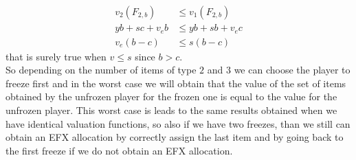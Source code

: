\documentclass{article}
\begin{document}
\begin{align*}
    v_2(F_{2,b}) &\le v_1(F_{2,b})\\
    yb + sc + v_e b &\le yb + sb + v_e c\\
    v_e(b-c) &\le s(b-c)
\end{align*}
that is surely true when $v\le s$ since $b> c$.\\
So depending on the number of items of type $2$ and $3$ we can choose the player to freeze first and in the worst case we will obtain that the value of the set of items obtained by the unfrozen player for the frozen one is equal to the value for the unfrozen player. This worst case is leads to the same results obtained when we have identical valuation functions, so also if we have two freezes, than we still can obtain an EFX allocation by correctly assign the last item and by going back to the first freeze if we do not obtain an EFX allocation.

\printbibliography %
\end{document}
